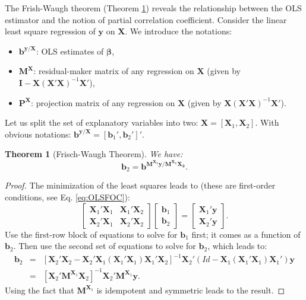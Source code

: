 \documentclass[
  12pt,
]{book}
\providecommand{\tightlist}{%
  \setlength{\itemsep}{0pt}\setlength{\parskip}{0pt}}
\newtheorem{theorem}{Theorem}[chapter]
\theoremstyle{definition}
\theoremstyle{definition}
\theoremstyle{definition}
\theoremstyle{definition}
\theoremstyle{remark}
\begin{document}
The Frish-Waugh theorem (Theorem \ref{thm:FW}) reveals the relationship between the OLS estimator and the notion of partial correlation coefficient. Consider the linear least square regression of \(\mathbf{y}\) on \(\mathbf{X}\). We introduce the notations:

\begin{itemize}
\tightlist
\item
  \(\mathbf{b}^{\mathbf{y}/\mathbf{X}}\): OLS estimates of \(\boldsymbol\beta\),
\item
  \(\mathbf{M}^{\mathbf{X}}\): residual-maker matrix of any regression on \(\mathbf{X}\) (given by \(\mathbf{I} - \mathbf{X} (\mathbf{X}'\mathbf{X})^{-1} \mathbf{X}'\)),
\item
  \(\mathbf{P}^{\mathbf{X}}\): projection matrix of any regression on \(\mathbf{X}\) (given by \(\mathbf{X} (\mathbf{X}'\mathbf{X})^{-1} \mathbf{X}'\)).
\end{itemize}

Let us split the set of explanatory variables into two: \(\mathbf{X} = [\mathbf{X}_1,\mathbf{X}_2]\). With obvious notations: \(\mathbf{b}^{\mathbf{y}/\mathbf{X}}=[\mathbf{b}_1',\mathbf{b}_2']'\).

\begin{theorem}[Frisch-Waugh Theorem]
\protect\hypertarget{thm:FW}{}\label{thm:FW}We have:
\[
\mathbf{b}_2 = \mathbf{b}^{\mathbf{M^{\mathbf{X}_1}y}/\mathbf{M^{\mathbf{X}_1}\mathbf{X}_2}}.
\]
\end{theorem}

\begin{proof}
The minimization of the least squares leads to (these are first-order conditions, see Eq. \eqref{eq:OLSFOC}):
\[
\left[ \begin{array}{cc} \mathbf{X}_1'\mathbf{X}_1 & \mathbf{X}_1'\mathbf{X}_2 \\ \mathbf{X}_2'\mathbf{X}_1 & \mathbf{X}_2'\mathbf{X}_2\end{array}\right]
\left[ \begin{array}{c} \mathbf{b}_1 \\ \mathbf{b}_2\end{array}\right] =
\left[ \begin{array}{c} \mathbf{X}_1' \mathbf{y} \\ \mathbf{X}_2' \mathbf{y} \end{array}\right].
\]
Use the first-row block of equations to solve for \(\mathbf{b}_1\) first; it comes as a function of \(\mathbf{b}_2\). Then use the second set of equations to solve for \(\mathbf{b}_2\), which leads to:
\begin{eqnarray*}
\mathbf{b}_2 &=& [\mathbf{X}_2'\mathbf{X}_2 - \mathbf{X}_2'\mathbf{X}_1(\mathbf{X}_1'\mathbf{X}_1)\mathbf{X}_1'\mathbf{X}_2]^{-1}\mathbf{X}_2'(Id - \mathbf{X}_1(\mathbf{X}_1'\mathbf{X}_1)\mathbf{X}_1')\mathbf{y}\\
&=& [\mathbf{X}_2' \mathbf{M}^{\mathbf{X}_1}\mathbf{X}_2]^{-1}\mathbf{X}_2'\mathbf{M}^{\mathbf{X}_1}\mathbf{y}.
\end{eqnarray*}
Using the fact that \(\mathbf{M}^{\mathbf{X}_1}\) is idempotent and symmetric leads to the result.
\end{proof}
\end{document}
